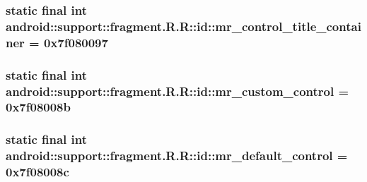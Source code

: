 \hypertarget{classandroid_1_1support_1_1fragment_1_1_r_1_1id_d81eb588b52efe95406924dcd976c78b}{
\subsubsection[{mr\_\-control\_\-title\_\-container}]{\setlength{\rightskip}{0pt plus 5cm}static final int android::support::fragment.R.R::id::mr\_\-control\_\-title\_\-container = 0x7f080097}}
\label{classandroid_1_1support_1_1fragment_1_1_r_1_1id_d81eb588b52efe95406924dcd976c78b}


\hypertarget{classandroid_1_1support_1_1fragment_1_1_r_1_1id_e98392cd2b7f223595f969a92e975750}{
\subsubsection[{mr\_\-custom\_\-control}]{\setlength{\rightskip}{0pt plus 5cm}static final int android::support::fragment.R.R::id::mr\_\-custom\_\-control = 0x7f08008b}}
\label{classandroid_1_1support_1_1fragment_1_1_r_1_1id_e98392cd2b7f223595f969a92e975750}


\hypertarget{classandroid_1_1support_1_1fragment_1_1_r_1_1id_20e117d7581faba9a1c24b177378da02}{
\subsubsection[{mr\_\-default\_\-control}]{\setlength{\rightskip}{0pt plus 5cm}static final int android::support::fragment.R.R::id::mr\_\-default\_\-control = 0x7f08008c}}
\label{classandroid_1_1support_1_1fragment_1_1_r_1_1id_20e117d7581faba9a1c24b177378da02}


